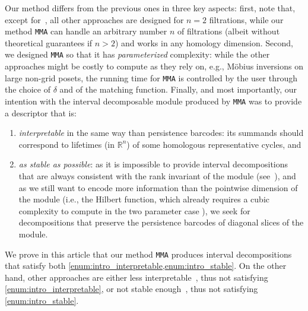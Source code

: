 \documentclass{article}
\newcommand{\R}{\mathbb{R}}
\newcommand{\MMA}{\texttt{MMA}}
\begin{document}
Our method differs from the previous ones in three key aspects: first, note
that, except for~\cite{asashibaIntervalReplacementsPersistence2024,
bjerkevikStabilizingDecompositionMultiparameter2025}, all other approaches are
designed for $n=2$ filtrations, while our method \MMA{} can handle an arbitrary
number $n$ of filtrations (albeit without theoretical guarantees if $n > 2$)
and works in any homology dimension. Second, we designed \MMA{} so that it has
{\em parameterized} complexity: while the other approaches might be costly to
compute as they rely on, e.g., Möbius inversions on large non-grid posets, the
running time for \MMA{} is controlled by the user through the choice of
$\delta$ and of the matching function. Finally, and most importantly, our
intention with the interval decomposable module produced by \MMA{} was to
provide a descriptor that is:

\begin{enumerate}[label=(\textit{\roman*})]
    \item {}\label{enum:intro_interpretable} {\em interpretable} in the same
	way than  persistence barcodes: its summands should correspond to
	lifetimes (in $\R^n$) of some homologous representative cycles, and
    \item {}\label{enum:intro_stable} {\em as stable as possible}: as it is
	impossible to provide interval decompositions that are always consistent with
	the rank invariant of the module (see~\cite[Section
	10.2.3]{lesnickNotesMultiparameterPersistence2023}), and as we still
	want to encode more information than the pointwise dimension of the
	module (i.e., the Hilbert function, which already requires a cubic
	complexity to compute in the two parameter case
	\cite{clauseMetaDiagrams2ParameterPersistence2023}), we seek for
	decompositions that
	preserve the persistence barcodes of diagonal slices of
	the module.
\end{enumerate}

We prove in this article that our method \MMA{} produces interval
decompositions that satisfy both
\cref{enum:intro_interpretable,enum:intro_stable}. On the other hand, other
approaches are either less
interpretable~\cite{deyRectangularApproximationStability2021,
asashibaApproximation2DPersistence2023,
asashibaIntervalReplacementsPersistence2024,
bjerkevikStabilizingDecompositionMultiparameter2025,
russoldGraphcodeLearningMultiparameter2024,
kerberRepresentingTwoparameterPersistence2025}, thus not satisfying
\ref{enum:intro_interpretable}, or not stable
enough~\cite{carriereMultiparameterPersistenceImage2020,
caiElderRuleStaircodesAugmentedMetric2021}, thus not satisfying
\ref{enum:intro_stable}.
\end{document}
